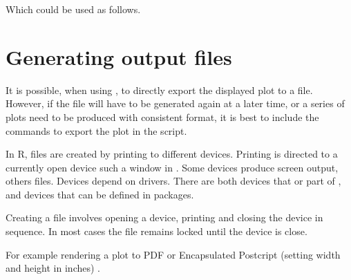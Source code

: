 \documentclass[krantz2]{krantz}\usepackage{knitr}%
\begin{document}
Which could be used as follows.

\begin{knitrout}\footnotesize
{}\color{fgcolor}\begin{kframe}
\begin{alltt}
\hlstd{(} 
          \hlstd{(}   
           \hlstd{=}  \hlopt{+}
          \hlstd{()}
\end{alltt}
\end{kframe}
\end{knitrout}

\section{Generating output files}
It is possible, when using \RStudio, to directly export the displayed plot to a file. However, if the file will have to be generated again at a later time, or a series of plots need to be produced with consistent format, it is best to include the commands to export the plot in the script.

In R, files are created by printing to different devices. Printing is directed to a currently open device such a window in \RStudio. Some devices produce screen output, others files. Devices depend on drivers. There are both devices that or part of \Rlang, and devices that can be defined in packages.

Creating a file involves opening a device, printing and closing the device in sequence. In most cases the file remains locked until the device is close.

For example rendering a plot to PDF or Encapsulated Postcript (setting width and height in inches) .

\begin{knitrout}\footnotesize
{}\color{fgcolor}\begin{kframe}
\begin{alltt}
 \hlkwb{<-} \hlstd{(}\hlstd{(} \hlstd{=} \hlopt{-}\hlopt{:}\hlstd{),} \hlstd{(}  \hlopt{+}
  \hlstd{(} 
\hlstd{(} \hlstd{=} \hlstd{,}  \hlstd{=} \hlstd{,}  \hlstd{=} \hlstd{)}
\hlstd{()}
\end{alltt}
\end{kframe}
\end{knitrout}
\end{document}
